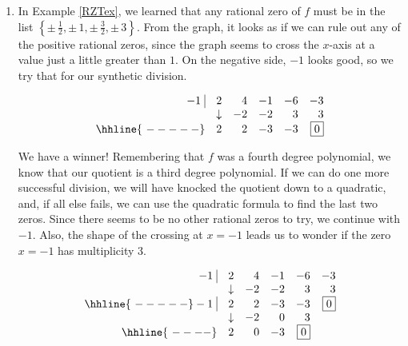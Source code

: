 \begin{ex}
\begin{enumerate}
\begin{center}
\begin{tabular}{cc}
\end{tabular}
\end{center}

\item  In Example \ref{RZTex}, we learned that any rational zero of $f$ must be in the list $\left\{\pm \, \frac{1}{2}, \pm \, 1, \pm \, \frac{3}{2}, \pm \, 3\right\}$.  From the graph, it looks as if we can rule out any of the positive rational zeros, since the graph seems to cross the $x$-axis at a value just a little greater than $1$. On the negative side, $-1$ looks good, so we try that for our synthetic division.

\[\begin{array}{rrrrrr}

 -1 \, \, \vline& 2 & 4 & -1  & -6 & -3 \\

  & \downarrow     &  -2  &  -2  & 3 & 3\\ \hhline{~-----} 
  
  &  2            &   2  & -3 & -3 &  \fbox{$0$}  \\

\end{array}\]

We have a winner!  Remembering that $f$ was a fourth degree polynomial, we know that our quotient is a third degree polynomial.  If we can do one more successful division, we will have knocked the quotient down to a quadratic, and, if all else fails, we can use the quadratic formula to find the last two zeros.  Since there seems to be no other rational zeros to try, we continue with $-1$.  Also, the shape of the crossing at $x = -1$ leads us to wonder if the zero $x = -1$ has multiplicity 3.

\[\begin{array}{rrrrrr}
 -1 \, \, \vline& 2 & 4 & -1  & -6 & -3 \\

  & \downarrow     &  -2  &  -2  & 3 & 3\\ \hhline{~-----} 
  
  -1 \, \, \vline&  2 &   2  & -3 & -3 &  \fbox{$0$}  \\
    
               & \downarrow &  -2  &  0  & 3 &\\ \hhline{~----} 
 
   & 2  &   0  & -3& \fbox{0} &   \\
  
        

\end{array}\]



\end{enumerate}
\end{ex}
